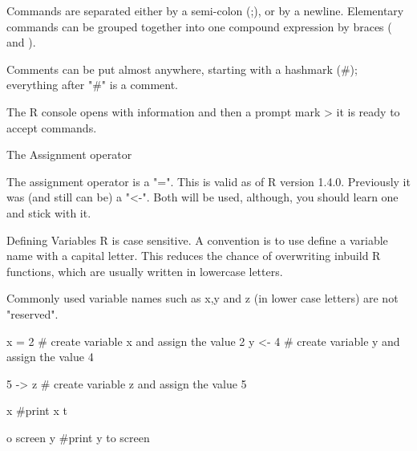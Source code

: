 \begin{frame}
Commands are separated either by a semi-colon (;), or by a newline. Elementary commands can be grouped together into one compound expression by braces ({ and }). 

Comments can be put almost anywhere, starting with a hashmark (#); everything after "#" is a comment.
\end{frame}
\begin{frame}
The R console opens with information and then a prompt mark  >  it is ready to accept commands.
\end{frame}
\begin{frame}
The Assignment operator

The assignment operator is a "=". This is valid as of R version 1.4.0. Previously it was (and still can be) a "<-".
Both will be used, although, you should learn one and stick with it.
\end{frame}
\begin{frame}
Defining Variables 
R is case sensitive.
A convention is to use define a variable name with a capital letter. This reduces the chance of overwriting inbuild R functions, which are usually written in lowercase letters.
\end{frame}
\begin{frame}
Commonly used variable names such as x,y and z (in lower case letters) are not "reserved".

x = 2           # create variable x and assign the value 2
y <- 4          # create variable y and assign the value 4
\end{frame}
\begin{frame}5 -> z          # create variable z and assign the value 5

x  #print x t\end{frame}o screen
y  #print y to screen
